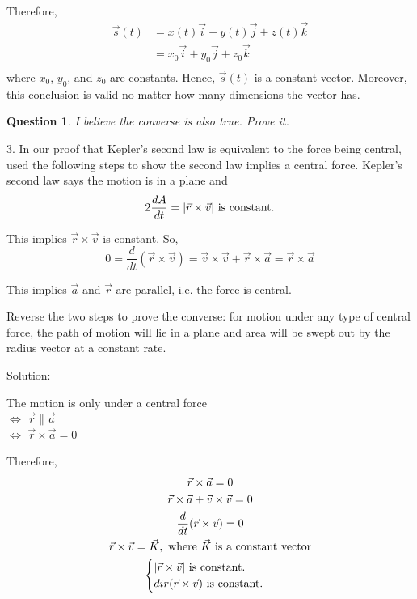 \documentclass{article}
\newtheorem{question}{Question}
\begin{document}
Therefore,
\begin{equation*}
  \begin{split}
    \vec{s}(t) &= x(t) \vec{i} + y(t) \vec{j} + z(t) \vec{k} \\
               &= x_0 \vec{i} + y_0 \vec{j} + z_0 \vec{k} \\
  \end{split}
\end{equation*}
where $x_0$, $y_0$, and $z_0$ are constants. Hence, $\vec{s}(t)$ is a constant 
vector. Moreover, this conclusion is valid no matter how many dimensions the 
vector has.

\begin{question}
  I believe the converse is also true. Prove it.
\end{question}

\bigskip

3. In our proof that Kepler's second law is equivalent to the force being 
central, used the following steps to show the second law implies a central force. 
Kepler's second law says the motion is in a plane and 
\begin{equation*}
  2 \frac{dA}{dt} = |\vec{r} \times \vec{v}| \textnormal{ is constant.}
\end{equation*}

This implies $\vec{r} \times \vec{v}$ is constant. So,
\begin{equation*}
  0 = \frac{d}{dt}(\vec{r} \times \vec{v}) = \vec{v} \times \vec{v} + \vec{r} \times \vec{a} = \vec{r} \times \vec{a}
\end{equation*}

This implies $\vec{a}$ and $\vec{r}$ are parallel, i.e. the force is central.

Reverse the two steps to prove the converse: for motion under any type of 
central force, the path of motion will lie in a plane and area will be swept out 
by the radius vector at a constant rate.

Solution:

The motion is only under a central force \\
$\iff$ $\vec{r} \parallel \vec{a}$ \\
$\iff$ $\vec{r} \times \vec{a} = 0$

Therefore,
\begin{gather*}
  \vec{r} \times \vec{a} = 0 \\
  \vec{r} \times \vec{a} + \vec{v} \times \vec{v} = 0 \\
  \frac{d}{dt} (\vec{r} \times \vec{v}) = 0 \\
  \vec{r} \times \vec{v} = \vec{K},\ \textnormal{where $\vec{K}$ is a constant vector} \\
  \begin{cases}
    |\vec{r} \times \vec{v}| \textnormal{ is constant.} \\
    dir(\vec{r} \times \vec{v}) \textnormal{ is constant.} \\
  \end{cases}
\end{gather*}
\end{document}
